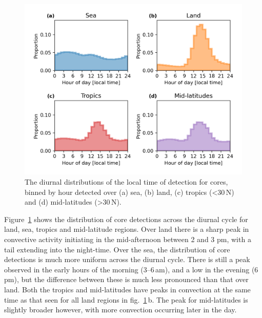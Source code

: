 \begin{figure}[tp]
    \centering
    \includegraphics[width=\textwidth]{figures/chapter2_12.png}
    \caption[
    The diurnal distributions of the local time of detection for cores detected over land, sea, tropics and mid-latitudes
    ]{
    The diurnal distributions of the local time of detection for cores, binned by hour detected over (a) sea, (b) land, (c) tropics (\textless 30\,\textdegree N) and (d) mid-latitudes (\textgreater 30\,\textdegree N).
    }
    \label{fig:core_diurnal_land_sea}
\end{figure}


Figure~\ref{fig:core_diurnal_land_sea} shows the distribution of core detections across the diurnal cycle for land, sea, tropics and mid-latitude regions.
Over land there is a sharp peak in convective activity initiating in the mid-afternoon between 2 and 3 pm, with a tail extending into the night-time.
Over the sea, the distribution of core detections is much more uniform across the diurnal cycle.
There is still a peak observed in the early hours of the morning (3--6\,am), and a low in the evening (6\,pm), but the difference between these is much less pronounced than that over land.
Both the tropics and mid-latitudes have peaks in convection at the same time as that seen for all land regions in fig.~\ref{fig:core_diurnal_land_sea}\,b.
The peak for mid-latitudes is slightly broader however, with more convection occurring later in the day.

